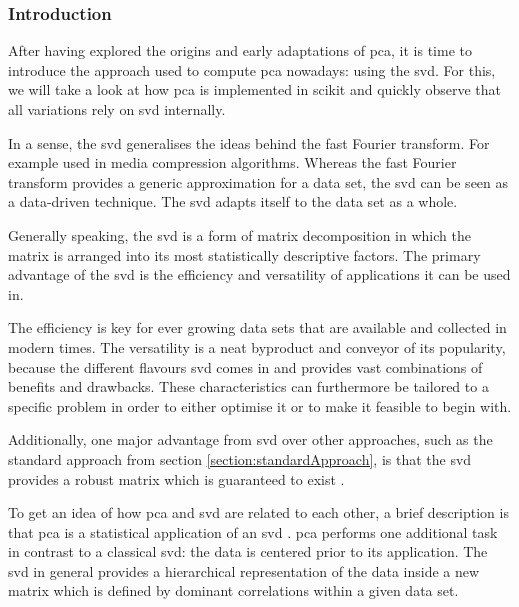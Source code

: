 \subsubsection{Introduction}

After having explored the origins and early adaptations of \gls{pca}, it is time to introduce the approach used to compute \gls{pca} nowadays: using the \acrlong{svd}.
For this, we will take a look at how \gls{pca} is implemented in \gls{scikit} and quickly observe that all variations rely on \gls{svd} internally.\bigskip


In a sense, the \gls{svd} generalises the ideas behind the fast Fourier transform.
For example used in media compression algorithms. 
Whereas the fast Fourier transform provides a generic approximation for a data set, the \gls{svd} can be seen as a data-driven technique.
The \gls{svd} adapts itself to the data set as a whole.
\bigskip


Generally speaking, the \gls{svd} is a form of matrix decomposition in which the matrix is arranged into its most statistically descriptive factors.
The primary advantage of the \gls{svd} is the efficiency and versatility of applications it can be used in.

The efficiency is key for ever growing data sets that are available and collected in modern times.
The versatility is a neat byproduct and conveyor of its popularity, because the different flavours \gls{svd} comes in and provides vast combinations of benefits and drawbacks.
These characteristics can furthermore be tailored to a specific problem in order to either optimise it or to make it feasible to begin with.

Additionally, one major advantage from \gls{svd} over other approaches, such as the standard approach from section \ref{section:standardApproach}, is that the \gls{svd} provides a robust matrix which is guaranteed to exist \cite{brunton2019data}.\bigskip



To get an idea of how \gls{pca} and \gls{svd} are related to each other, a brief description is that \gls{pca} is a statistical application of an \gls{svd} \cite{brunton2019data}.
\Gls{pca} performs one additional task in contrast to a classical \gls{svd}: the data is centered prior to its application.
The \gls{svd} in general provides a hierarchical representation of the data inside a new matrix which is defined by dominant correlations within a given data set.
\bigskip



